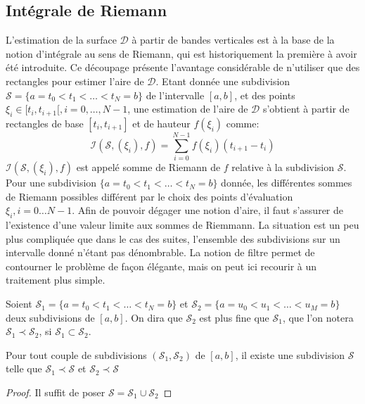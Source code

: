 \subsection{Intégrale de Riemann}
L'estimation de la surface $\mathcal{D}$ à partir de bandes verticales est à la
base de la notion d'intégrale au sens de Riemann, qui est historiquement la
première à avoir été introduite. Ce découpage présente l'avantage considérable
de n'utiliser que des rectangles pour estimer l'aire de $\mathcal{D}$. Etant
donnée une subdivision $\mathcal{S}= \{ a = t_0 < t_1 < \dots < t_N = b \}$ de
l'intervalle $[a,b]$, et des points $\xi_i \in [t_i, t_{i+1}[, i = 0, \dots
,N-1$, une estimation de l'aire de $\mathcal{D}$ s'obtient à partir de
rectangles de base $[t_i, t_{i+1}]$ et de hauteur $f(\xi_i)$ comme:
\[
\mathcal{I}(\mathcal{S}, (\xi_i), f) =\sum_{i=0}^{N-1}
f(\xi_i)(t_{i+1}-t_i) \] $\mathcal{I}(\mathcal{S}, (\xi_i), f)$ est appelé somme
de Riemann de $f$ relative à la subdivision $\mathcal{S}$. Pour une subdivision
$\{ a = t_0 < t_1 < \dots < t_N = b \}$ donnée, les différentes sommes de Riemann
possibles différent par le choix des points d'évaluation $\xi_i, i=0 \dots N-1$.
Afin de pouvoir dégager une notion d'aire, il faut s'assurer de l'existence
d'une valeur limite aux sommes de Riemmann. La situation est un peu plus
compliquée que dans le cas des suites, l'ensemble des subdivisions sur un
intervalle donné n'étant pas dénombrable. La notion de filtre permet de
contourner le problème de façon élégante, mais on peut ici recourir à un
traitement plus simple. 
\begin{defn}
Soient  $\mathcal{S}_1= \{ a = t_0 < t_1 < \dots < t_N =
b \}$  et $\mathcal{S}_2= \{ a = u_0 < u_1 < \dots < u_M =
b \}$ deux subdivisions de $[a,b]$. On dira que $\mathcal{S}_2$ est plus fine
que $\mathcal{S}_1$, que l'on notera $\mathcal{S}_1 \prec \mathcal{S}_2$, si
$\mathcal{S}_1 \subset \mathcal{S}_2$.
\end{defn}

\begin{prop}\label{prop:union_subdivisions}
Pour tout couple de subdivisions $(\mathcal{S}_1,\mathcal{S}_2)$ de $[a,b]$, il
existe une subdivision $\mathcal{S}$ telle que $\mathcal{S}_1 \prec \mathcal{S}$
et $\mathcal{S}_2 \prec \mathcal{S}$
\end{prop}
\begin{proof}
Il suffit de poser $\mathcal{S}=\mathcal{S}_1 \cup \mathcal{S}_2$
\end{proof}

